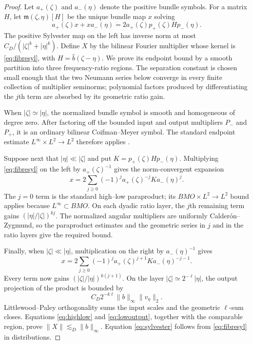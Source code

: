 \documentclass[11pt]{article}
\begin{document}
\begin{proof}
Let $a_+(\zeta)$ and $a_-(\eta)$ denote the positive bundle symbols.  For a
matrix $H$, let $\mathfrak m(\zeta,\eta)[H]$ be the unique bundle map $x$
solving
\begin{equation}\label{eq:fibresyl}
 a_+(\zeta)x+xa_-(\eta)
 =2a_+(\zeta)p_+(\zeta)H p_-(\eta).
\end{equation}
The positive Sylvester map on the left has inverse norm at most
$C_D/(|\zeta|^k+|\eta|^k)$.  Define $X$ by the bilinear Fourier multiplier
whose kernel is \eqref{eq:fibresyl}, with
$H=\widehat b(\zeta-\eta)$.  We prove its endpoint bound by a smooth partition
into three frequency-ratio regions.  The separation constant is chosen small
enough that the two Neumann series below converge in every finite collection
of multiplier seminorms; polynomial factors produced by differentiating the
$j$th term are absorbed by its geometric ratio gain.

When $|\zeta|\simeq|\eta|$, the normalized bundle symbol is smooth and
homogeneous of degree zero.  After factoring off the bounded input and output
multipliers $P_-$ and $P_+$, it is an ordinary bilinear Coifman--Meyer symbol.
The standard endpoint estimate $L^\infty\times L^2\to L^2$ therefore applies
\cite[Introduction]{ARL}.

Suppose next that $|\eta|\ll|\zeta|$ and put
$K=p_+(\zeta)H p_-(\eta)$.  Multiplying \eqref{eq:fibresyl} on the left by
$a_+(\zeta)^{-1}$ gives the norm-convergent expansion
\begin{equation}\label{eq:highlow}
 x=2\sum_{j\geq0}(-1)^j
 a_+(\zeta)^{-j}K a_-(\eta)^j.
\end{equation}
The $j=0$ term is the standard high--low paraproduct; its
$BMO\times L^2\to L^2$ bound applies because $L^\infty\subset BMO$.  On each
dyadic ratio layer, the $j$th remaining term gains
$(|\eta|/|\zeta|)^{kj}$.  The normalized angular multipliers are uniformly
Calder\'on--Zygmund, so the paraproduct estimates and the geometric series in
$j$ and in the ratio layers give the required bound.

Finally, when $|\zeta|\ll|\eta|$, multiplication on the right by
$a_-(\eta)^{-1}$ gives
\begin{equation}\label{eq:lowoutput}
 x=2\sum_{j\geq0}(-1)^j
 a_+(\zeta)^{j+1}K a_-(\eta)^{-j-1}.
\end{equation}
Every term now gains
$(|\zeta|/|\eta|)^{k(j+1)}$.  On the layer
$|\zeta|\simeq2^{-\ell}|\eta|$, the output projection of the product is
bounded by
\[
 C_D2^{-k\ell}\|b\|_\infty\|v_\eta\|_2.
\]
Littlewood--Paley orthogonality sums the input scales and the geometric
$\ell$-sum closes.  Equations \eqref{eq:highlow} and
\eqref{eq:lowoutput}, together with the comparable region, prove
$\|X\|\lesssim_D\|b\|_\infty$.  Equation \eqref{eq:sylvester} follows from
\eqref{eq:fibresyl} in distributions.
\end{proof}
\end{document}
